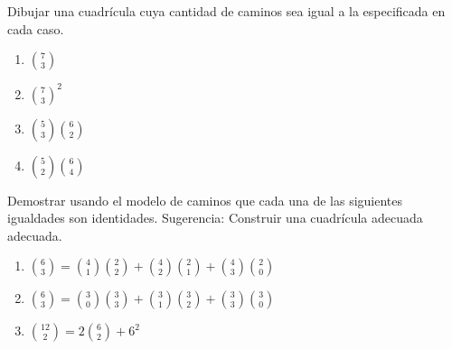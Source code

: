 \begin{problema}
    Dibujar una cuadrícula cuya cantidad de caminos sea igual a la especificada en cada caso.

    \renewcommand{\theenumi}{\alph{enumi})}
    \begin{enumerate}

        

        \item $\binom{7}{3}$
        \item $\binom{7}{3}^2$
        \item $\binom{5}{3}\binom{6}{2}$
        \item $\binom{5}{2}\binom{6}{4}$
    \end{enumerate}
    \renewcommand{\theenumi}{\arabic{enumi}}
\end{problema}



\begin{problema}
    Demostrar usando el modelo de caminos que cada una de las siguientes igualdades son identidades. Sugerencia: Construir una cuadrícula adecuada adecuada.


    \renewcommand{\theenumi}{\alph{enumi})}
    \begin{enumerate}

        \item $\binom{6}{3}=\binom{4}{1}\binom{2}{2}+\binom{4}{2}\binom{2}{1}+\binom{4}{3}\binom{2}{0}$  

        


        \item $\binom{6}{3}=\binom{3}{0}\binom{3}{3}+\binom{3}{1}\binom{3}{2}+\binom{3}{3}\binom{3}{0}$

        
        


        \item $\binom{12}{2}=2\binom{6}{2}+6^2$


        
    \end{enumerate}
\end{problema}

\renewcommand{\theenumi}{\arabic{enumi}}




